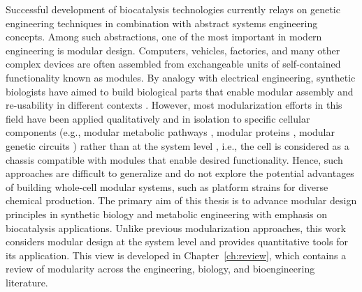 Successful development of biocatalysis technologies currently relays on genetic engineering techniques in combination with abstract systems engineering concepts.
Among such abstractions, one of the most important in modern engineering is modular design.
Computers, vehicles, factories, and many other complex devices are often assembled from exchangeable units of self-contained functionality known as modules.
By analogy with electrical engineering, synthetic biologists have aimed to build biological parts that enable modular assembly and re-usability in different contexts \citep{shetty2008}.
However, most modularization efforts in this field have been applied qualitatively and in isolation to specific cellular components (e.g., modular metabolic pathways \citep{biggs2014}, modular proteins \citep{maervoet2017}, modular genetic circuits \citep{slusarczyk2012}) rather than at the system level \citep{purnick2009}, i.e., the cell is considered as a chassis compatible with modules that enable desired functionality. %
Hence, such approaches are difficult to generalize and do not explore the potential advantages of building whole-cell modular systems, such as platform strains \citep{nielsen2016} for diverse chemical production.
The primary aim of this thesis is to advance modular design principles in synthetic biology and metabolic engineering with emphasis on biocatalysis applications.
Unlike previous modularization approaches, this work considers modular design at the system level and provides quantitative tools for its application.
This view is developed in Chapter~\ref{ch:review}, which contains a review of modularity across the engineering, biology, and bioengineering literature.


